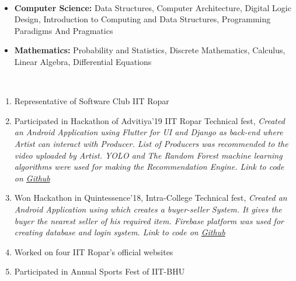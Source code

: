 \documentclass[a4paper,10pt]{awesome}
\newcommand{\isep}{-2 pt}
\newcommand{\lsep}{-0.5cm}
\begin{document}
\\[\lsep]
    \begin{itemize}
        \item \textbf{Computer Science: }Data Structures, Computer Architecture, Digital Logic Design, 
            Introduction to Computing and Data Structures, Programming Paradigms And Pragmatics
	    \item \textbf{Mathematics: }Probability and Statistics, Discrete Mathematics, Calculus, Linear Algebra, Differential Equations
    \end{itemize}
\\[\lsep]
\begin{enumerate}\itemsep \isep
    \item Representative of Software Club IIT Ropar
    \item Participated in Hackathon of Advitiya'19 IIT Ropar Technical fest, 
        \emph{Created an Android Application using Flutter for UI and Django as back-end where Artist can interact
        with Producer. List of Producers was recommended to the video uploaded by Artist. YOLO and The Random Forest
        machine learning algorithms were used for making the Recommendation Engine. 
        Link to code on \href{https://github.com/jainammm/Tropikat-advitiya}{Github}}
    \item Won Hackathon in Quintessence’18, Intra-College Technical fest, \emph{Created an Android 
        Application using which creates a buyer-seller System.
        It gives the buyer the nearest seller of his required item. Firebase platform was used 
        for creating database and login system. Link to code on 
        \href{https://github.com/dilip640/Daiquiris}{Github}}
    \item Worked on four IIT Ropar’s official websites
    \item Participated in Annual Sports Fest of IIT-BHU
\end{enumerate}
\end{document}
